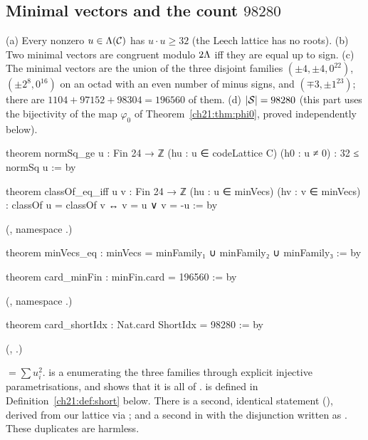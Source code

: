 \subsection{Minimal vectors and the count \texorpdfstring{$98280$}{98280}}

\begin{theorem}\label{ch21:thm:minvecs}
(a) Every nonzero $u\in\Lambda(\mathcal{C})$ has $u\cdot u\ge32$ (the Leech lattice has no roots).
(b) Two minimal vectors are congruent modulo $2{\Lambda}$ iff they are equal up to sign.
(c) The minimal vectors are the union of the three disjoint families
$(\pm4,\pm4,0^{22})$, $(\pm2^8,0^{16})$ on an octad with an even number of minus signs, and
$(\mp3,\pm1^{23})$; there are $1104+97152+98304=196560$ of them.
(d) $|\mathcal{S}|=98280$ (this part uses the bijectivity of the map $\varphi_0$ of Theorem~\ref{ch21:thm:phi0}, proved independently below).
\end{theorem}
\begin{leancode}
theorem normSq_ge {u : Fin 24 → ℤ} (hu : u ∈ codeLattice C) (h0 : u ≠ 0) : 32 ≤ normSq u := by
\end{leancode}
\begin{leancode}
theorem classOf_eq_iff {u v : Fin 24 → ℤ} (hu : u ∈ minVecs) (hv : v ∈ minVecs) :
    classOf u = classOf v ↔ v = u ∨ v = -u := by
\end{leancode}
(, namespace .)
\begin{leancode}
theorem minVecs_eq : minVecs = minFamily₁ ∪ minFamily₂ ∪ minFamily₃ := by
\end{leancode}
\begin{leancode}
theorem card_minFin : minFin.card = 196560 := by
\end{leancode}
(, namespace .)
\begin{leancode}
theorem card_shortIdx : Nat.card ShortIdx = 98280 := by
\end{leancode}
(, .)
\begin{dictionary}
 $=\sum u_i^2$.   is a  enumerating the three families
through explicit injective parametrisations, and  shows that it is all of
.   is defined in Definition~\ref{ch21:def:short} below.  There is a
second, identical statement 
(), derived from our lattice via ; and a second
 in  with the disjunction written as .
These duplicates are harmless.
\end{dictionary}
